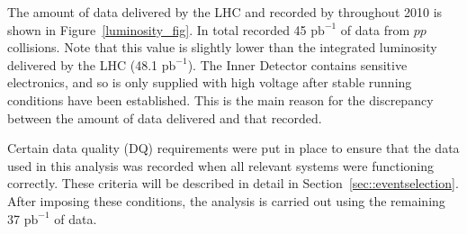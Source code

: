 
The amount of data delivered by the LHC and recorded by \atlas throughout 2010 is shown in Figure~\ref{luminosity_fig}. In total \atlas recorded 45 $\mathrm{pb}^{-1}$ of data from $pp$ collisions. Note that this value is slightly lower than the integrated luminosity delivered by the LHC (48.1 $\mathrm{pb}^{-1}$). The Inner Detector contains sensitive electronics, and so is only supplied with high voltage after stable running conditions have been established. This is the main reason for the discrepancy between the amount of data delivered and that recorded.

Certain data quality (DQ) requirements were put in place to ensure that the data used in this analysis was recorded when all relevant systems were functioning correctly. These criteria will be described in detail in Section~\ref{sec::eventselection}.  After imposing these conditions, the analysis is carried out using the remaining 37 $\mathrm{pb}^{-1}$ of data. 

%


